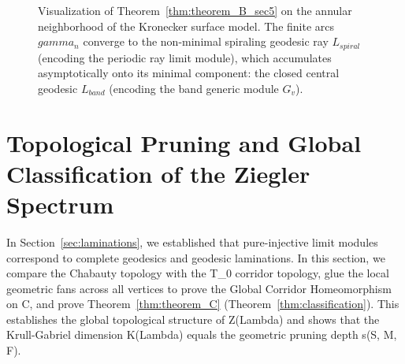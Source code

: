 \documentclass[11pt,a4paper,reqno]{amsart}
\def\({}%
\def\){}%
\def\mathcal#1{#1}%
\def\mathrm#1{#1}%
\def\operatorname#1{#1}%
\def\forb{F}%
\def\Zg{Z}%
\def\KG{K}%
\def\stgeo{s}%
\def\gamma{gamma}%
\def\Lambda{Lambda}%
\theoremstyle{definition}
\theoremstyle{remark}
\newcommand{\Zg}{\operatorname{Zg}}
\newcommand{\KG}{\operatorname{KG}}
\newcommand{\forb}{\mathfrak{F}}
\newcommand{\stgeo}{\operatorname{st}_{\mathrm{geo}}}
\begin{document}
\vspace{-0.9em}
\begin{figure}[htbp]
\centering
{}
\caption[Visualization of Theorem~\ref{thm:theorem_B_sec5}]{Visualization of Theorem~\ref{thm:theorem_B_sec5} on the annular neighborhood of the Kronecker surface model. The finite arcs $\gamma_n$ converge to the non-minimal spiraling geodesic ray $\mathcal{L}_{\mathrm{spiral}}$ (encoding the periodic ray limit module), which accumulates asymptotically onto its minimal component: the closed central geodesic $\mathcal{L}_{\mathrm{band}}$ (encoding the band generic module $G_v$).}
\label{fig:kronecker_torus}
\end{figure}


\vspace{-0.3em}
\section{Topological Pruning and Global Classification of the Ziegler Spectrum}
\label{sec:pruning_kg}

In Section~\ref{sec:laminations}, we established that pure-injective limit modules correspond to complete geodesics and geodesic laminations. In this section, we compare the Chabauty topology with the \(T_0\) corridor topology, glue the local geometric fans across all vertices to prove the Global Corridor Homeomorphism on \(C\), and prove Theorem~\ref{thm:theorem_C} (Theorem~\ref{thm:classification}). This establishes the global topological structure of \(\Zg(\Lambda)\) and shows that the Krull-Gabriel dimension \(\KG(\Lambda)\) equals the geometric pruning depth \(\stgeo(\mathcal{S}, \mathcal{M}, \forb)\).
\end{document}
